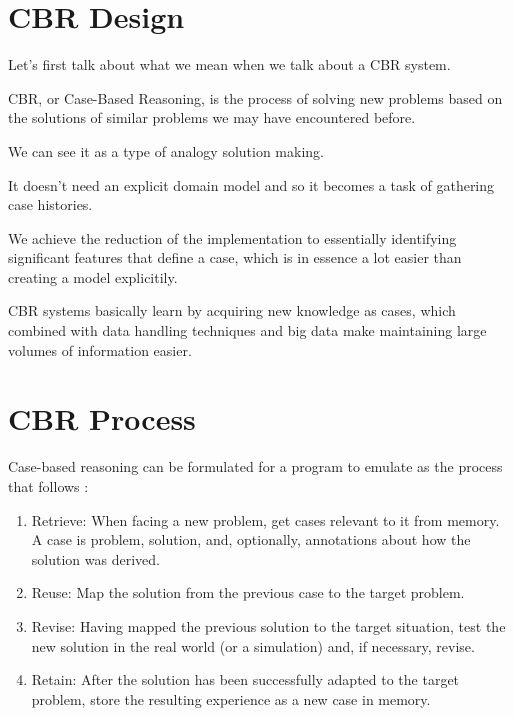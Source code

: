 \section{CBR Design}
\label{cap5:sec:introduccion}

Let's first talk about what we mean when we talk about a CBR system.\cite{Richter}

CBR, or Case-Based Reasoning, is the process of solving new problems based on the solutions of similar problems we may have encountered before.

We can see it as a type of analogy solution making.

It doesn't need an explicit domain model and so it becomes a task of gathering case histories. 

We achieve the reduction of the implementation to essentially identifying significant features that define a case, which is in essence a lot easier than creating a model explicitily. 

CBR systems basically learn by acquiring new knowledge as cases, which combined with data handling techniques and big data make maintaining large volumes of information easier.

\section{CBR Process}
\label{cap5:sec:process}

Case-based reasoning can be formulated for a program to emulate as the process that follows \cite{AamodtPlaza}:

\begin{enumerate}
\item Retrieve: When facing a new problem, get cases relevant to it from memory. A case is problem, solution, and, optionally, annotations about how the solution was derived. 
\item Reuse: Map the solution from the previous case to the target problem. 
\item Revise: Having mapped the previous solution to the target situation, test the new solution in the real world (or a simulation) and, if necessary, revise. 
\item Retain: After the solution has been successfully adapted to the target problem, store the resulting experience as a new case in memory. 
\end{enumerate}

